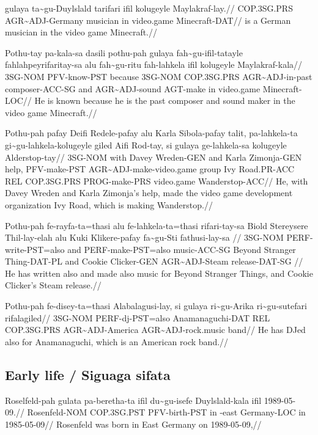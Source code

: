 \ex
\begingl
          \gla  gulaya ta\~{}gu-Duylslald tarifari ifil kolugeyle Maylakraf-lay.//
          \glb  COP.3SG.PRS AGR\~{}ADJ-Germany musician in video.game Minecraft-DAT//
          \glft is a German musician in the video game Minecraft.//
\endgl
\xe

\ex
\begingl
          \gla  Pothu-tay pa-kala-sa dasili pothu-pah gulaya fah\~{}gu-ifil-tatayle fahlahpeyrifaritay-sa alu fah\~{}gu-ritu fah-lahkela ifil kolugeyle Maylakraf-kala//
          \glb  3SG-NOM PFV-know-PST because 3SG-NOM COP.3SG.PRS AGR\~{}ADJ-in-past composer-ACC-SG and AGR\~{}ADJ-sound AGT-make in video.game Minecraft-LOC//
          \glft He is known because he is the past composer and sound maker in the video game Minecraft.//
\endgl
\xe

\ex
\begingl
          \gla  Pothu-pah pafay Deifi Redele-pafay alu Karla Sibola-pafay talit, pa-lahkela-ta gi\~{}gu-lahkela-kolugeyle giled Aifi Rod-tay, si gulaya ge-lahkela-sa kolugeyle Alderstop-tay//
          \glb  3SG-NOM with Davey Wreden-GEN and Karla Zimonja-GEN help, PFV-make-PST AGR\~{}ADJ-make-video.game group Ivy Road.PR-ACC REL COP.3SG.PRS PROG-make-PRS video.game Wanderstop-ACC//
          \glft He, with Davey Wreden and Karla Zimonja's help, made the video game development organization Ivy Road, which is making Wanderstop.//
\endgl
\xe

\ex
\begingl
          \gla  Pothu-pah fe-rayfa-ta=thasi   alu fe-lahkela-ta=thasi rifari-tay-sa  Biold   Stereysere Thil-lay-elah alu Kuki   Klikere-pafay fa\~{}gu-Sti     fathusi-lay-sa  //
          \glb  3SG-NOM   PERF-write-PST=also and PERF-make-PST=also  music-ACC-SG   Beyond  Stranger   Thing-DAT-PL  and Cookie Clicker-GEN   AGR\~{}ADJ-Steam release-DAT-SG //
          \glft He has written also and made also music for Beyond Stranger Things, and Cookie Clicker's Steam release.//
\endgl
\xe

\ex
\begingl
          \gla  Pothu-pah fe-disey-ta=thasi Alabalagusi-lay, si  gulaya      ri\~{}gu-Arika     ri\~{}gu-sutefari     rifalagiled//
          \glb  3SG-NOM   PERF-dj-PST=also  Anamanaguchi-DAT REL COP.3SG.PRS AGR\~{}ADJ-America AGR\~{}ADJ-rock.music band//
          \glft He has DJed also for Anamanaguchi, which is an American rock band.//
\endgl
\xe

\newpage

\subsection{Early life / Siguaga sifata}
\ex
\begingl
\gla  Roselfeld-pah gulata      pa-beretha-ta ifil du\~{}gu-isefe Duylslald-kala ifil 1989-05-09.//
\glb  Rosenfeld-NOM COP.3SG.PST PFV-birth-PST  in   \agradj{}-east Germany-LOC    in   1985-05-09//
\glft Rosenfeld was born in East Germany on 1989-05-09,//
\endgl
\xe


